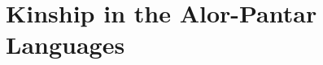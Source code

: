 

\chapter{Kinship in the Alor-Pantar Languages}

\begin{figure}
\caption{}
\end{figure}


\begin{figure}
\caption{}
\end{figure}


\begin{figure}
\caption{}
\end{figure}


\begin{figure}
\caption{}
\end{figure}
\clearpage

\begin{figure}
\caption{}
\end{figure}


\begin{figure}
\caption{}
\end{figure}


\begin{figure}
\caption{}
\end{figure}


\begin{figure}
\caption{}
\end{figure}


\begin{figure}
\caption{}
\end{figure}

\clearpage
\begin{figure}
\caption{}
\end{figure}


